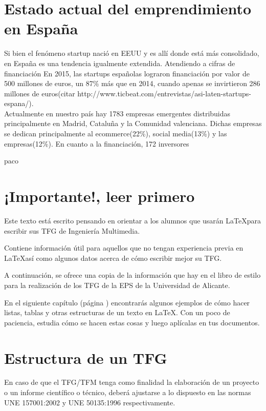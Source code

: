 \section{Estado actual del emprendimiento en España}

Si bien el fenómeno startup nació en EEUU y es allí donde está más consolidado, en España es una tendencia igualmente extendida. Atendiendo a cifras de financiación En 2015, las startups españolas lograron financiación por valor de 500 millones de euros, un 87\%   más que en 2014, cuando apenas se invirtieron 286 millones de euros(citar http://www.ticbeat.com/entrevistas/asi-laten-startups-espana/).\\
Actualmente en nuestro país hay 1783 empresas emergentes \cite{startupxplore2017} distribuidas principalmente en Madrid, Cataluña y la Comunidad valenciana. Dichas empresas se dedican principalmente al ecommerce(22\%), social media(13\%) y las empresas(12\%). En cuanto a la financiación, 172 inversores 



paco 
\section{¡Importante!, leer primero}

Este texto está escrito pensando en orientar a los alumnos que usarán \LaTeX para escribir sus TFG de Ingeniería Multimedia.

Contiene información útil para aquellos que no tengan experiencia previa en \LaTeX así como algunos datos acerca de cómo escribir mejor su TFG.

A continuación, se ofrece una copia de la información que hay en el libro de estilo para la realización de los TFG de la EPS de la Universidad de Alicante.

En el siguiente capítulo (página \pageref{marcoteorico}) encontrarás algunos ejemplos de cómo hacer listas, tablas y otras estructuras de un texto en \LaTeX. Con un poco de paciencia, estudia cómo se hacen estas cosas y luego aplícalas en tus documentos.

\section{Estructura de un TFG}

En caso de que el TFG/TFM tenga como finalidad la elaboración de un proyecto o un 
informe científico o técnico, deberá ajustarse a lo dispuesto en las normas UNE 
157001:2002 y UNE 50135:1996 respectivamente.

